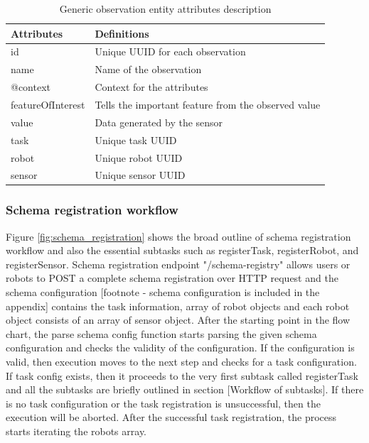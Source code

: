	\begin{table}[h!]
		\begin{tabular}{|l|p{12cm}|}
			\hline
			\textbf{Attributes} & \textbf{Definitions} \\ \hline
			
				id & Unique UUID for each observation \\ \hline
				name & Name of the observation \\ \hline
				@context & Context for the attributes \\ \hline
				featureOfInterest & Tells the important feature from the observed value \\ \hline
				value & Data generated by the sensor \\ \hline
				task & Unique task UUID \\ \hline
				robot & Unique robot UUID \\ \hline
				sensor & Unique sensor UUID \\ \hline

			
		\end{tabular}
		\caption{Generic observation entity attributes description}
		\label{tab:observation}
	\end{table}

	\subsubsection{Schema registration workflow}
	Figure \ref{fig:schema_registration} shows the broad outline of schema registration workflow and also the essential subtasks such as registerTask,  registerRobot, and registerSensor. Schema registration endpoint "/schema-registry" allows users or robots to POST a complete schema registration over HTTP request and the schema configuration [footnote - schema configuration is included in the appendix] contains the task information, array of robot objects and each robot object consists of an array of sensor object. After the starting point in the flow chart, the parse schema config function starts parsing the given schema configuration and checks the validity of the configuration. If the configuration is valid, then execution moves to the next step and checks for a task configuration. If task config exists, then it proceeds to the very first subtask called registerTask and all the subtasks are briefly outlined in section [Workflow of subtasks]. If there is no task configuration or the task registration is unsuccessful, then the execution will be aborted.  After the successful task registration, the process starts iterating the robots array. 
	
